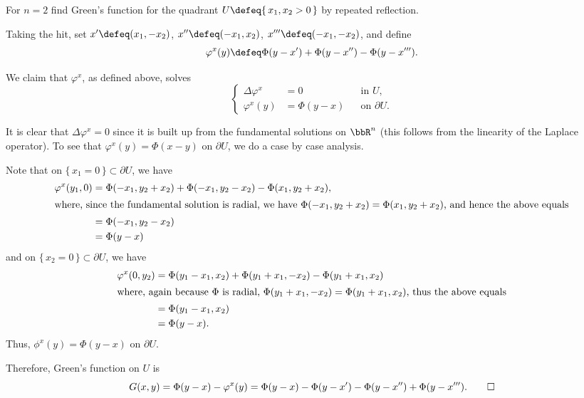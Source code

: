 \begin{problem}
  For \(n=2\) find Green's function for the quadrant
  \(U\defeq\{\,x_1,x_2>0\,\}\) by repeated reflection.
\end{problem}
\begin{solution}
  Taking the hit, set \(x'\defeq(x_1,-x_2)\), \(x''\defeq(-x_1,x_2)\),
  \(x'''\defeq(-x_1,-x_2)\), and define
  \begin{equation}
    \label{eq:6:corrector}
    \varphi^x(y)\defeq\Phi(y-x')+\Phi(y-x'')-\Phi(y-x''').
  \end{equation}

  We claim that \(\varphi^x\), as defined above, solves
  \[
    \left\{
      \begin{aligned}
        \Delta\varphi^x&=0&&\text{in \(U\),}\\
        \varphi^x(y)&=\Phi(y-x)&&\text{on \(\partial U\).}
      \end{aligned}
    \right.
  \]

  It is clear that \(\Delta\varphi^x=0\) since it is built up from the
  fundamental solutions on \(\bbR^n\) (this follows from the linearity of
  the Laplace operator). To see that \(\varphi^x(y)=\Phi(x-y)\) on
  \(\partial U\), we do a case by case analysis.

  Note that on \(\{\,x_1=0\,\}\subset\partial U\), we have
  \begin{align*}
    \varphi^x(y_1,0)
    &=\Phi(-x_1,y_2+x_2)+\Phi(-x_1,y_2-x_2)-\Phi(x_1,y_2+x_2),\\
    \intertext{where, since the fundamental solution is radial, we have
    \(\Phi(-x_1,y_2+x_2)=\Phi(x_1,y_2+x_2)\), and hence the above equals}
    &=\Phi(-x_1,y_2-x_2)\\
    &=\Phi(y-x)
  \end{align*}
  and on \(\{\,x_2=0\,\}\subset\partial U\), we have
  \begin{align*}
    \varphi^x(0,y_2)
    &=\Phi(y_1-x_1,x_2)+\Phi(y_1+x_1,-x_2)-\Phi(y_1+x_1,x_2)\\
    \intertext{where, again because \(\Phi\) is radial,
    \(\Phi(y_1+x_1,-x_2)=\Phi(y_1+x_1,x_2)\), thus the above equals}
    &=\Phi(y_1-x_1,x_2)\\
    &=\Phi(y-x).
  \end{align*}
  Thus, \(\phi^x(y)=\Phi(y-x)\) on \(\partial U\).

  Therefore, Green's function on \(U\) is
  \[
    G(x,y)
    =\Phi(y-x)-\varphi^x(y)%
    =\Phi(y-x)-\Phi(y-x')-\Phi(y-x'')+\Phi(y-x''').%
    \qedhere
  \]
\end{solution}
\newpage


